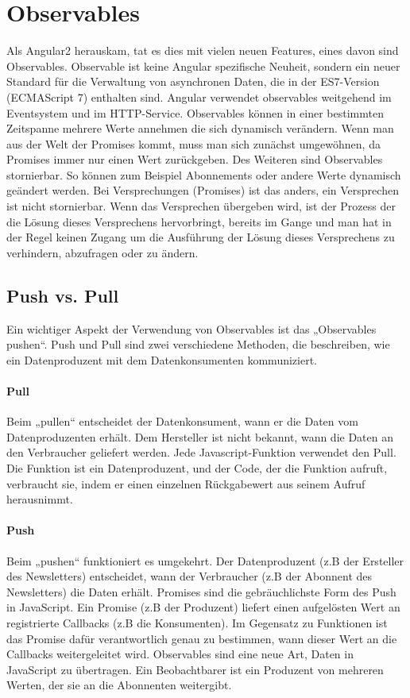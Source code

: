 \section{Observables}
Als Angular2 herauskam, tat es dies mit vielen neuen Features, eines davon sind Observables\cite{Observables}. Observable ist keine Angular spezifische Neuheit, sondern ein neuer Standard für die Verwaltung von asynchronen Daten, die in der ES7-Version (ECMAScript 7) enthalten sind. Angular verwendet observables weitgehend im Eventsystem und im HTTP-Service.
Observables können in einer bestimmten Zeitspanne mehrere Werte annehmen die sich dynamisch verändern.
Wenn man aus der Welt der Promises kommt, muss man sich zunächst umgewöhnen, da Promises immer nur einen Wert zurückgeben. Des Weiteren sind Observables stornierbar. So können zum Beispiel Abonnements oder andere Werte dynamisch geändert werden.
Bei Versprechungen (Promises) ist das anders, ein Versprechen ist nicht stornierbar. Wenn das Versprechen übergeben wird, ist der Prozess der die Lösung dieses Versprechens hervorbringt, bereits im Gange und man hat in der Regel keinen Zugang um die Ausführung der Lösung dieses Versprechens zu verhindern, abzufragen oder zu ändern.
\subsection{Push vs. Pull}
Ein wichtiger Aspekt der Verwendung von Observables ist das „Observables pushen“. Push und Pull sind zwei verschiedene Methoden, die beschreiben, wie ein Datenproduzent mit dem Datenkonsumenten kommuniziert.
\paragraph{Pull}
Beim „pullen“ entscheidet der Datenkonsument, wann er die Daten vom Datenproduzenten erhält. Dem Hersteller ist nicht bekannt, wann die Daten an den Verbraucher geliefert werden.
Jede Javascript-Funktion verwendet den Pull. Die Funktion ist ein Datenproduzent, und der Code, der die Funktion aufruft, verbraucht sie, indem er einen einzelnen Rückgabewert aus seinem Aufruf herausnimmt.
\paragraph{Push}
Beim „pushen“ funktioniert es umgekehrt. Der Datenproduzent (z.B der Ersteller des Newsletters) entscheidet, wann der Verbraucher (z.B der Abonnent des Newsletters) die Daten erhält. 
Promises sind die gebräuchlichste Form des Push in JavaScript. 
Ein Promise (z.B der Produzent) liefert einen aufgelösten Wert an registrierte Callbacks (z.B die Konsumenten). Im Gegensatz zu Funktionen ist das Promise dafür verantwortlich genau zu bestimmen, wann dieser Wert an die Callbacks weitergeleitet wird. 
Observables sind eine neue Art, Daten in JavaScript zu übertragen. Ein Beobachtbarer ist ein Produzent von mehreren Werten, der sie an die Abonnenten weitergibt.
